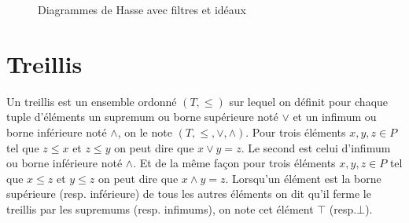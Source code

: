 \begin{figure}[H]
	\begin{minipage}{0.3\textwidth}
	\begin{center}
	\end{center}
	\end{minipage}
	\begin{minipage}{0.3\textwidth}
	\begin{center}
	\end{center}
	\end{minipage}
	\begin{minipage}{0.3\textwidth}
	\begin{center}
	\end{center}
	\end{minipage}
	\caption{Diagrammes de Hasse avec filtres et idéaux}
	\label{hasse_filtres_ideaux}
\end{figure}

\section{Treillis}

Un treillis est un ensemble ordonné $(T, \leq)$ sur lequel on définit pour chaque tuple d'éléments un supremum ou borne supérieure noté $\vee$ et un infimum ou borne inférieure noté $\wedge$, on le note $(T, \leq, \vee, \wedge)$. Pour trois éléments $x, y, z \in P$ tel que $z \leq x$ et $z \leq y$ on peut dire que $x \vee y = z$. Le second est celui d'infimum ou borne inférieure noté $\wedge$. Et de la même façon pour trois éléments $x, y, z \in P$ tel que $x \leq z$ et $y \leq z$ on peut dire que $x \wedge y = z$. Lorsqu'un élément est la borne supérieure (resp. inférieure) de tous les autres éléments on dit qu'il ferme le treillis par les supremums (resp. infimums), on note cet élément $\top$ (resp.$\bot$).

